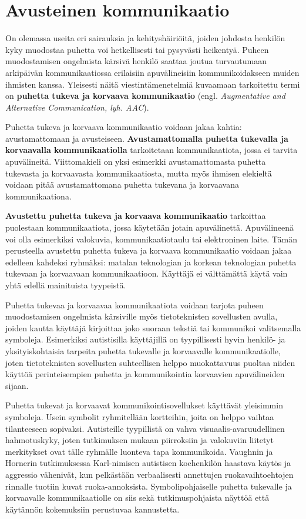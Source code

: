 \documentclass[utf8]{gradu3}
\begin{document}
\section{Avusteinen kommunikaatio}

On olemassa useita eri sairauksia ja kehityshäiriöitä, joiden johdosta henkilön kyky muodostaa puhetta voi hetkellisesti tai pysyvästi heikentyä. Puheen muodostamisen ongelmista kärsivä henkilö saattaa joutua turvautumaan arkipäivän kommunikaatiossa erilaisiin apuvälineisiin kommunikoidakseen muiden ihmisten kanssa. Yleisesti näitä viestintämenetelmiä kuvaamaan tarkoitettu termi on \textbf{puhetta tukeva ja korvaava kommunikaatio} (engl. \textit{Augmentative and Alternative Communication, lyh. AAC}).

Puhetta tukeva ja korvaava kommunikaatio voidaan jakaa kahtia: avustamattomaan ja avusteiseen. \textbf{Avustamattomalla puhetta tukevalla ja korvaavalla kommunikaatiolla} tarkoitetaan kommunikaatiota, jossa ei tarvita apuvälineitä. Viittomakieli on yksi esimerkki avustamattomasta puhetta tukevasta ja korvaavasta kommunikaatiosta, mutta myös ihmisen elekieltä voidaan pitää avustamattomana puhetta tukevana ja korvaavana kommunikaationa. 

\textbf{Avustettu puhetta tukeva ja korvaava kommunikaatio} tarkoittaa puolestaan kommunikaatiota, jossa käytetään jotain apuvälinettä. Apuvälineenä voi olla esimerkiksi valokuvia, kommunikaatiotaulu tai elektroninen laite. Tämän perusteella avustettu puhetta tukeva ja korvaava kommunikaatio voidaan jakaa edelleen kahdeksi ryhmäksi: matalan teknologian ja korkean teknologian puhetta tukevaan ja korvaavaan kommunikaatioon. Käyttäjä ei välttämättä käytä vain yhtä edellä mainituista tyypeistä. \parencite[]{AAC-conditional-use}

Puhetta tukevaa ja korvaavaa kommunikaatiota voidaan tarjota puheen muodostamisen ongelmista kärsiville myös tietoteknisten sovellusten avulla, joiden kautta käyttäjä kirjoittaa joko suoraan tekstiä tai kommunikoi valitsemalla symboleja. Esimerkiksi autistisilla käyttäjillä on tyypillisesti hyvin henkilö- ja yksityiskohtaisia tarpeita puhetta tukevalle ja korvaavalle kommunikaatiolle, joten tietoteknisten sovellusten suhteellisen helppo muokattavuus puoltaa niiden käyttöä perinteisempien puhetta ja kommunikointia korvaavien apuvälineiden sijaan.

\label{AAC-symbols}
Puhetta tukevat ja korvaavat kommunikointisovellukset käyttävät yleisimmin symboleja. Usein symbolit ryhmitellään kortteihin, joita on helppo vaihtaa tilanteeseen sopivaksi\label{AAC-cards}. Autisteille tyypillistä on vahva visuaalis-avaruudellinen hahmotuskyky, joten tutkimuksen mukaan piirroksiin ja valokuviin liitetyt merkitykset ovat tälle ryhmälle luonteva tapa kommunikoida. Vaughnin ja Hornerin tutkimuksessa \parencite[]{concrete-versus-verbal} Karl-nimisen autistisen koehenkilön haastava käytös ja aggressio vähenivät, kun pelkästään verbaalisesti annettujen ruokavaihtoehtojen rinnalle tuotiin kuvat ruoka-annoksista. Symbolipohjaiselle puhetta tukevalle ja korvaavalle kommunikaatiolle on siis sekä tutkimuspohjaista näyttöä että käytännön kokemuksiin perustuvaa kannustetta.
\end{document}
